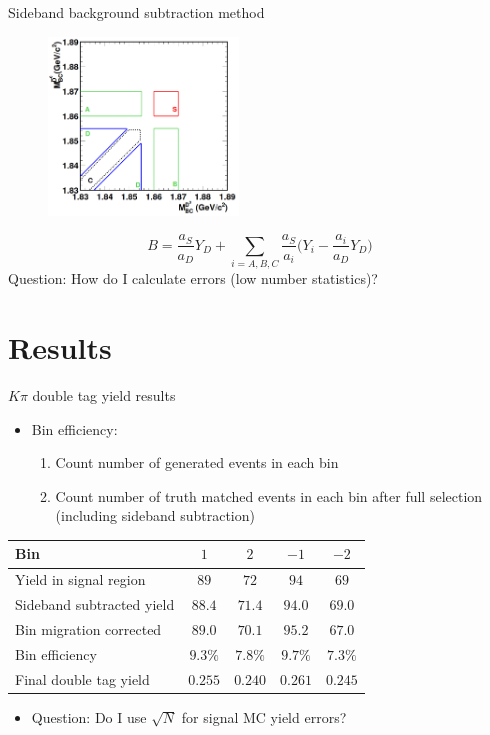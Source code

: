 \documentclass{beamer}
\begin{document}
\begin{frame}{Sideband background subtraction method}
  \begin{figure}
    \centering
    \includegraphics[width=0.45\textwidth]{MBC2D.png}
  \end{figure}
  \begin{equation*}
    B = \frac{a_S}{a_D}Y_D + \sum_{i = A, B, C}\frac{a_S}{a_i}\Big(Y_i - \frac{a_i}{a_D}Y_D\Big)
  \end{equation*}
  Question: How do I calculate errors (low number statistics)?
\end{frame}

\section{Results}
\begin{frame}{$K\pi$ double tag yield results}
  \begin{itemize}
    \item{Bin efficiency:}
    \begin{enumerate}
      \item{Count number of generated events in each bin}
      \item{Count number of truth matched events in each bin after full selection (including sideband subtraction)}
    \end{enumerate}
  \end{itemize}
  \vspace{0.5cm}
  \centering
  \def\arraystretch{1.2}%
  \begin{tabular}{l|cccc}
    \hline
    Bin & $1$    & $2$    & $-1$   & $-2$ \\
    \hline
    Yield in signal region    & $89$    & $72$    & $94$    & $69$ \\
    Sideband subtracted yield & $88.4$  & $71.4$  & $94.0$  & $69.0$ \\
    Bin migration corrected   & $89.0$  & $70.1$  & $95.2$  & $67.0$ \\
    Bin efficiency            & $9.3\%$ & $7.8\%$ & $9.7\%$ & $7.3\%$ \\
    Final double tag yield    & $0.255$ & $0.240$ & $0.261$ & $0.245$ \\
    \hline
  \end{tabular}
  \vspace{0.5cm}
  \begin{itemize}
    \item{Question: Do I use $\sqrt{N}$ for signal MC yield errors?}
  \end{itemize}
\end{frame}
\end{document}
